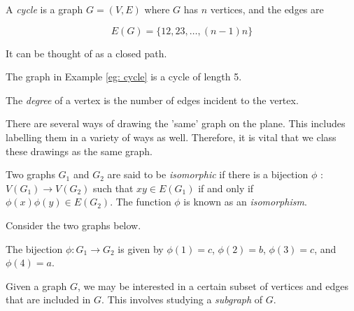 \begin{definition}
A \textit{cycle} is a graph $G = (V,E)$  where $G$ has $n$ vertices, and the edges are 

\[
E(G) = \{12, 23, \hdots, (n-1)n \}
\]

\noindent
It can be thought of as a closed path. 
\end{definition}

\begin{example}
The graph in Example \ref{eg: cycle} is a cycle of length 5.
\end{example}

\begin{definition}
The \textit{degree} of a vertex is the number of edges incident to the vertex.
\end{definition}

\begin{flushleft}
There are several ways of drawing the 'same' graph on the plane. This includes labelling them in a variety of ways as well. Therefore, it is vital that we class these drawings as the same graph.
\end{flushleft}

\begin{definition}
\label{def: isomorphism}
Two graphs $G_1$ and $G_2$ are said to be \textit{isomorphic} if there is a bijection $\phi$ : $V(G_1) \rightarrow V(G_2)$ such that $xy \in E(G_1)$ if and only if $\phi(x)\phi(y) \in E(G_2)$. The function $\phi$ is known as an \textit{isomorphism}.
\end{definition}

\begin{example}
\label{eg: isomorphic graphs}
Consider the two graphs below.

\begin{figure}[ht]
    \centering
    
    \label{fig:isomoprhic graphs}
\end{figure}
\vspace{-5 mm}
\begin{flushleft}
The bijection $\phi : G_1 \rightarrow G_2$ is given by $\phi(1) = c$, $\phi(2) = b$, $\phi(3) = c$, and $\phi(4) = a$.    
\end{flushleft}
\end{example}

\begin{flushleft}
Given a graph $G$, we may be interested in a certain subset of vertices and edges that are included in $G$. This involves studying a \textit{subgraph} of $G$.
\end{flushleft}

